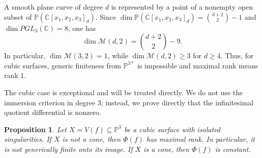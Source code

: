 \documentclass[11pt]{amsart}
\theoremstyle{plain}
\newtheorem{prop}[subsection]{Proposition}
\theoremstyle{definition}
\numberwithin{equation}{section}
\newcommand{\M}{{\mathcal M}}
\newcommand{\C}{\mathbb{C}}
\newcommand{\PP}{\mathbb{P}}
\begin{document}
A smooth plane curve of degree $d$ is represented by a point of a nonempty open
subset of $\PP(\C[x_1,x_2,x_3]_d)$. Since
$\dim\PP(\C[x_1,x_2,x_3]_d)=\binom{d+2}{2}-1$ and $\dim PGL_3(\C)=8$, one has
\[
\dim \M(d,2)=\binom{d+2}{2}-9.
\]
In particular, $\dim\M(3,2)=1$, while $\dim\M(d,2)\geq3$ for $d\geq4$. Thus, for
cubic surfaces, generic finiteness from $\PP^{3*}$ is impossible and maximal
rank means rank $1$.

The cubic case is exceptional and will be treated directly. We do not use the
immersion criterion in degree $3$; instead, we prove directly that the
infinitesimal quotient differential is nonzero.

\begin{prop}
\label{prop:cubic-surfaces}
Let $X=V(f)\subseteq\PP^3$ be a cubic surface with isolated singularities. If
$X$ is not a cone, then $\Phi(f)$ has maximal rank. In particular, it is not
generically finite onto its image. If $X$ is a cone, then $\Phi(f)$ is constant.
\end{prop}
\end{document}
